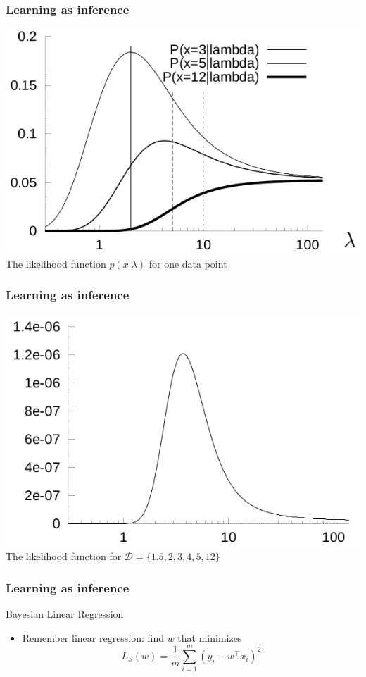 \documentclass{beamer}
\begin{document}
\begin{frame}
	\frametitle{Learning as inference}
   \includegraphics[width=.8\textwidth]{e12}\\
     The likelihood function $p(x|\lambda)$ for one data point
\end{frame}

\begin{frame}
	\frametitle{Learning as inference}
   \includegraphics[width=.8\textwidth]{e13}\\
	The likelihood function for $\mathcal{D}=\{1.5,2,3,4,5,12\}$
\end{frame}


\begin{frame}
	\frametitle{Learning as inference}
	\begin{block}{Bayesian Linear Regression}
	\begin{itemize}
	\item Remember linear regression: find $w$ that minimizes
$$L_S(w) =\frac{1}{m} \sum_{i=1}^m (y_i-w^\top x_i)^2 $$
	\end{itemize}
	\end{block}
\end{frame}
\end{document}
